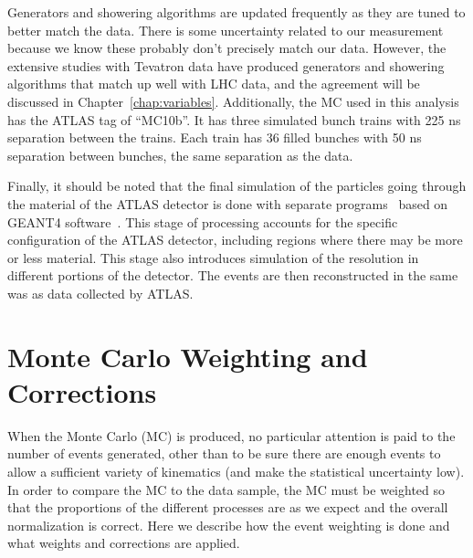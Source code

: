 Generators and showering algorithms are updated frequently as they are tuned to better match the data.  There is some uncertainty related to our measurement because we know these probably don't precisely match our data.  However, the extensive studies with Tevatron data have produced generators and showering algorithms that match up well with LHC data, and the agreement will be discussed in Chapter~\ref{chap:variables}.  Additionally, the MC used in this analysis has the ATLAS tag of ``MC10b''.  It has three simulated bunch trains with 225 ns separation between the trains.  Each train has 36 filled bunches with 50 ns separation between bunches, the same separation as the data.  

Finally, it should be noted that the final simulation of the particles going through the material of the ATLAS detector is done with separate programs~\cite{ATLASSIM} based on {\sc GEANT4} software~\cite{GEANT}.  This stage of processing accounts for the specific configuration of the ATLAS detector, including regions where there may be more or less material.  This stage also introduces simulation of the resolution in different portions of the detector.  The events are then reconstructed in the same was as data collected by ATLAS.

\section{Monte Carlo Weighting and Corrections}
When the Monte Carlo (MC) is produced, no particular attention is paid to the number of events generated, other than to be sure there are enough events to allow a sufficient variety of kinematics (and make the statistical uncertainty low).  In order to compare the MC to the data sample, the MC must be weighted so that the proportions of the different processes are as we expect and the overall normalization is correct.  Here we describe how the event weighting is done and what weights and corrections are applied.


